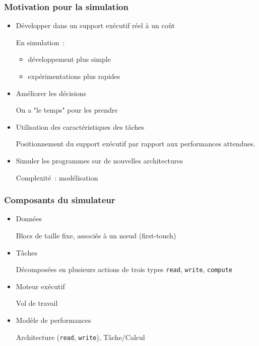 \documentclass[xcolor={usenames,dvipsnames,svgnames,table}, aspectratio=43]{beamer}
\renewcommand{\emph}[1]{{\usebeamercolor[fg]{titlelike}#1}}
\begin{document}
\begin{frame}[fragile]
  \frametitle{Motivation pour la simulation}

  \begin{itemize}
    \item Développer dans un support exécutif réel à un coût

      En simulation~:
      \begin{itemize}
	\item développement plus simple
	\item expérimentations plus rapides
      \end{itemize}

    \item Améliorer les décisions

      On a "le temps" pour les prendre

    \item Utilisation des caractéristiques des tâches

      Positionnement du support exécutif par rapport aux performances attendues.

    \item Simuler les programmes sur de nouvelles architectures

      Complexité~: modélisation
  \end{itemize}


\end{frame}

\begin{frame}[fragile]
  \frametitle{Composants du simulateur}
  \begin{itemize}
    \item Données

      Blocs de taille fixe, associés à un nœud (\emph{first-touch})

    \item Tâches

      Décomposées en plusieurs actions de trois types \verb/read/, \verb/write/, \verb/compute/

    \item Moteur exécutif

      Vol de travail

    \item Modèle de performances

      Architecture (\verb/read/, \verb/write/), Tâche/Calcul
  \end{itemize}

\end{frame}
\end{document}
